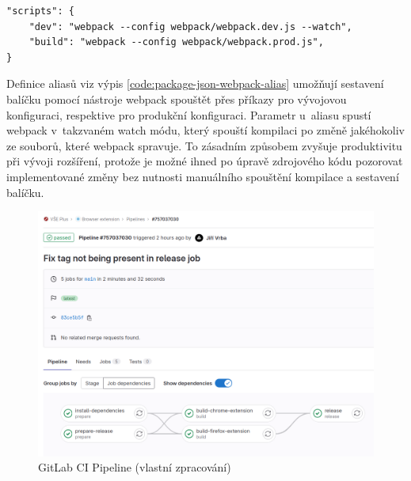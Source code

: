 \begin{lstlisting}[label={code:package-json-webpack-alias}, caption={Definice aliasů pro práci s~nástrojem webpack (vlastní zpracování)}]
"scripts": {
    "dev": "webpack --config webpack/webpack.dev.js --watch",
    "build": "webpack --config webpack/webpack.prod.js",
}
\end{lstlisting}

Definice aliasů viz výpis \ref{code:package-json-webpack-alias} umožňují sestavení balíčku pomocí nástroje webpack spouštět přes příkazy  pro vývojovou konfiguraci, respektive  pro produkční konfiguraci. Parametr  u~aliasu  spustí webpack v~takzvaném watch módu, který spouští kompilaci po změně jakéhokoliv ze souborů, které webpack spravuje. To zásadním způsobem zvyšuje produktivitu při vývoji rozšíření, protože je možné ihned po úpravě zdrojového kódu pozorovat implementované změny bez nutnosti manuálního spouštění kompilace a sestavení balíčku.

\begin{figure}[htbp!]\centering
    \includegraphics[width=\textwidth]{img/extension-gitlab-ci-pipeline-overview.png}
    \caption{GitLab CI Pipeline (vlastní zpracování)}
    \label{fig:extension-gitlab-ci}
\end{figure}

